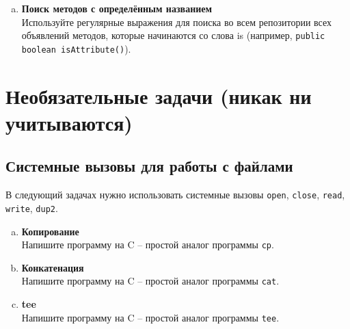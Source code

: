 \documentclass{article}
\begin{document}
\begin{enumerate}[a.]
 
\item \textbf{Поиск методов с определённым названием}\\
Используйте регулярные выражения для поиска во всем репозитории всех объявлений методов, которые начинаются со слова is (например, \texttt{public boolean isAttribute()}).




\end{enumerate}


\newpage
\section{Необязательные задачи (никак ни учитываются)}
\subsection{Системные вызовы для работы с файлами}
В следующий задачах нужно использовать системные вызовы \texttt{open}, \texttt{close}, \texttt{read}, \texttt{write}, \texttt{dup2}.
\begin{enumerate}[a.]
\item \textbf{Копирование}\\
Напишите программу на C -- простой аналог программы \texttt{cp}.
\item \textbf{Конкатенация}\\
Напишите программу на C -- простой аналог программы \texttt{cat}.
\item \textbf{tee}\\
Напишите программу на C -- простой аналог программы \texttt{tee}.
\end{enumerate}

\iffalse
\newpage
~
\newpage
Что нужно добавить
\begin{itemize}
\item  Скобочки () - сабшелл.
\item  Использование дефиса (-)
\item \textbf{base64/shasum}
\end{itemize}
\fi
\end{document}
